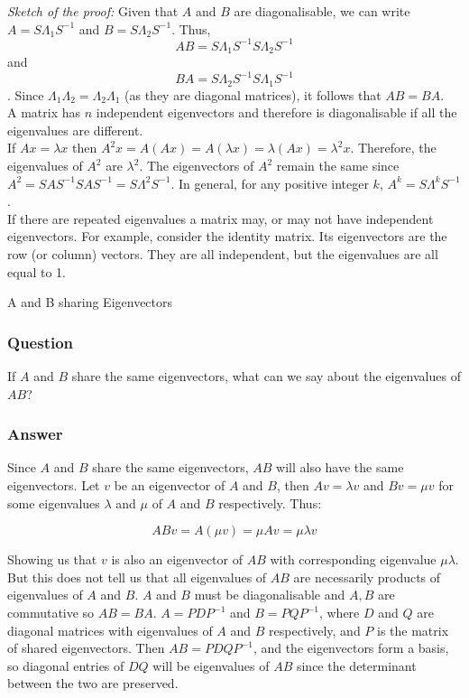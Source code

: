 \textit{Sketch of the proof:} Given that \( A \) and \( B \) are diagonalisable, we can write \( A = S\Lambda_1S^{-1} \) and \( B = S\Lambda_2S^{-1} \). Thus, 
\[ AB = S\Lambda_1S^{-1}S\Lambda_2S^{-1} \] 
and 
\[ BA = S\Lambda_2S^{-1}S\Lambda_1S^{-1} \].
Since \( \Lambda_1\Lambda_2 = \Lambda_2\Lambda_1 \) (as they are diagonal matrices), it follows that \( AB = BA \).\\

A matrix has \( n \) independent eigenvectors and therefore is diagonalisable if all the eigenvalues are different.\\

If \( Ax = \lambda x \) then \( A^2x = A(Ax) = A(\lambda x) = \lambda (Ax) = \lambda^2 x \). Therefore, the eigenvalues of \( A^2 \) are \( \lambda^2 \). The eigenvectors of \( A^2 \) remain the same since \( A^2 = SAS^{-1}SAS^{-1} = S\Lambda^2S^{-1} \). In general, for any positive integer \( k \), \( A^k = S\Lambda^kS^{-1} \).\\

If there are repeated eigenvalues a matrix may, or may not have independent eigenvectors. For example, consider the identity matrix. Its eigenvectors are the row (or column) vectors. They are all independent, but the eigenvalues are all equal to 1.\\
 \begin{examplebox}{A and B sharing Eigenvectors}
\subsubsection*{Question}
If \( A \) and \( B \) share the same eigenvectors, what can we say about the eigenvalues of \( AB \)?

\subsubsection*{Answer} Since $A$ and $B$ share the same eigenvectors, $AB$ will also have the same eigenvectors. Let $v$ be an eigenvector of $A$ and $B$, then $Av = \lambda v$ and $Bv = \mu v$ for some eigenvalues $\lambda$ and $\mu$ of $A$ and $B$ respectively. Thus:

\[ABv = A(\mu v) = \mu Av = \mu\lambda v\]

Showing us that $v$ is also an eigenvector of $AB$ with corresponding eigenvalue $\mu\lambda$. But this does not tell us that all eigenvalues of $AB$ are necessarily products of eigenvalues of $A$ and $B$. $A$ and $B$ must be diagonalisable and $A,B$ are commutative so $AB = BA$. $A=PDP^{-1}$ and $B = PQP^{-1}$, where $D$ and $Q$ are diagonal matrices with eigenvalues of $A$ and $B$ respectively, and $P$ is the matrix of shared eigenvectors. Then $AB = PDQP^{-1}$, and the eigenvectors form a basis, so diagonal entries of $DQ$ will be eigenvalues of $AB$ since the determinant between the two are preserved. \\
\end{examplebox}


